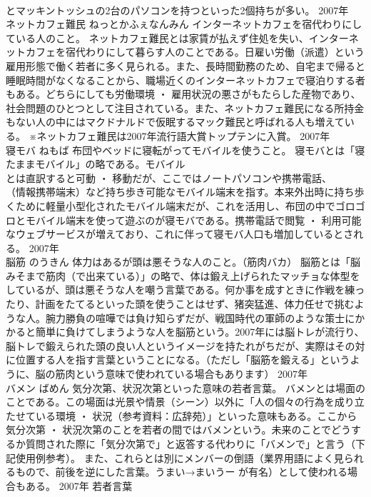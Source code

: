 \documentclass[8pt]{extreport}
\begin{document}
\begin{CJK}{UTF8}{min}
\\	とマッキントッシュの2台のパソコンを持つといった2個持ちが多い。	2007年	
\\	ネットカフェ難民	ねっとかふぇなんみん	インターネットカフェを宿代わりにしている人のこと。	ネットカフェ難民とは家賃が払えず住処を失い、インターネットカフェを宿代わりにして暮らす人のことである。日雇い労働（派遣）という雇用形態で働く若者に多く見られる。また、長時間勤務のため、自宅まで帰ると睡眠時間がなくなることから、職場近くのインターネットカフェで寝泊りする者もある。どちらにしても労働環境 ・ 雇用状況の悪さがもたらした産物であり、社会問題のひとつとして注目されている。また、ネットカフェ難民になる所持金もない人の中にはマクドナルドで仮眠するマック難民と呼ばれる人も増えている。 ※ネットカフェ難民は2007年流行語大賞トップテンに入賞。	2007年	
\\	寝モバ	ねもば	布団やベッドに寝転がってモバイルを使うこと。	寝モバとは「寝たままモバイル」の略である。モバイル
\\	とは直訳すると可動 ・ 移動だが、ここではノートパソコンや携帯電話、
\\	（情報携帯端末）など持ち歩き可能なモバイル端末を指す。本来外出時に持ち歩くために軽量小型化されたモバイル端末だが、これを活用し、布団の中でゴロゴロとモバイル端末を使って遊ぶのが寝モバである。携帯電話で閲覧 ・ 利用可能なウェブサービスが増えており、これに伴って寝モバ人口も増加しているとされる。	2007年	
\\	脳筋	のうきん	体力はあるが頭は悪そうな人のこと。（筋肉バカ）	脳筋とは「脳みそまで筋肉（で出来ている）」の略で、体は鍛え上げられたマッチョな体型をしているが、頭は悪そうな人を嘲う言葉である。何か事を成すときに作戦を練ったり、計画をたてるといった頭を使うことはせず、猪突猛進、体力任せで挑むような人。腕力勝負の喧嘩では負け知らずだが、戦国時代の軍師のような策士にかかると簡単に負けてしまうような人を脳筋という。2007年には脳トレが流行り、脳トレで鍛えられた頭の良い人というイメージを持たれがちだが、実際はその対に位置する人を指す言葉ということになる。（ただし「脳筋を鍛える」というように、脳の筋肉という意味で使われている場合もあります）	2007年	
\\	バメン	ばめん	気分次第、状況次第といった意味の若者言葉。	バメンとは場面のことである。この場面は光景や情景（シーン）以外に「人の個々の行為を成り立たせている環境 ・ 状況（参考資料：広辞苑）」といった意味もある。ここから気分次第 ・ 状況次第のことを若者の間ではバメンという。未来のことでどうするか質問された際に「気分次第で」と返答する代わりに「バメンで」と言う（下記使用例参考）。 また、これらとは別にメンバーの倒語（業界用語によく見られるもので、前後を逆にした言葉。うまい→まいうー が有名）として使われる場合もある。	2007年	若者言葉	

\end{CJK}
\end{document}
